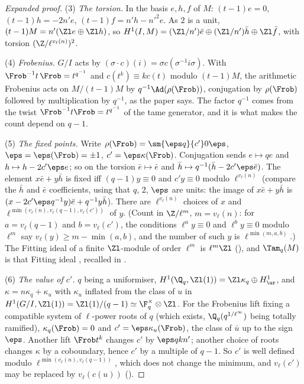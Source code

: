 \begin{sloppypar}
\begin{proof}[Expanded proof]
(3) \emph{The torsion.} In the basis $e,h,f$ of $M$: $(t-1)e=0$, $(t-1)h=-2n'e$, $(t-1)f=n'h-n'^2e$. As $2$ is a unit, $(t-1)M=n'(\Zl e\oplus\Zl h)$, so
$H^1(I,M)=(\Zl/n')\bar e\oplus(\Zl/n')\bar h\oplus\Zl\bar f$, with torsion $(\Z/\ell^{v_\ell(n)})^2$.

(4) \emph{Frobenius.} $G/I$ acts by $(\sigma\cdot c)(i)=\sigma c(\sigma^{-1}i\sigma)$. With $\Frob^{-1}t\,\Frob=t^{q^{-1}}$ and $c(t^k)\equiv kc(t)$ modulo $(t-1)M$, the arithmetic Frobenius acts on
$M/(t-1)M$ by $q^{-1}\Ad(\rho(\Frob))$, conjugation by $\rho(\Frob)$ followed by multiplication by $q^{-1}$, as the paper says. The factor $q^{-1}$ comes from the twist
$\Frob^{-1}t\Frob=t^{q^{-1}}$ of the tame generator, and it is what makes the count depend on $q-1$.

(5) \emph{The fixed points.} Write $\rho(\Frob)=\sm{\eps q}{c'}0{\eps}$, $\eps=\eps(\Frob)=\pm1$, $c'=\eps\kappa(\Frob)$. Conjugation sends $e\mapsto qe$ and $h\mapsto h-2c'\eps e$; so on the torsion
$\bar e\mapsto\bar e$ and $\bar h\mapsto q^{-1}(\bar h-2c'\eps\bar e)$. The element $x\bar e+y\bar h$ is fixed iff $(q-1)y\equiv0$ and $c'y\equiv0$ modulo $\ell^{v_\ell(n)}$ (compare the $\bar h$ and $\bar e$
coefficients, using that $q$, $2$, $\eps$ are units: the image of $x\bar e+y\bar h$ is $(x-2c'\eps q^{-1}y)\bar e+q^{-1}y\bar h$). There are $\ell^{v_\ell(n)}$ choices of $x$ and $\ell^{\min(v_\ell(n),v_\ell(q-1),v_\ell(c'))}$ of $y$.
(Count in $\Z/\ell^m$, $m=v_\ell(n)$: for $a=v_\ell(q-1)$ and $b=v_\ell(c')$, the conditions $\ell^ay\equiv0$ and $\ell^by\equiv0$ modulo $\ell^m$ say $v_\ell(y)\ge m-\min(a,b)$, and the number of such $y$ is
$\ell^{\min(m,a,b)}$.) The Fitting ideal of a finite $\Zl$-module of order
$\ell^m$ is $\ell^m\Zl$ (), and $\Tam_q(M)$ is that Fitting ideal \cite[I.4.2.2]{FPR94}, recalled in \cite[p.~708]{DFG04}.

(6) \emph{The value of $c'$.} $q$ being a uniformiser, $H^1(\Q_q,\Zl(1))=\Zl\kappa_q\oplus H^1_{\ur}$, and $\kappa=n\kappa_q+\kappa_u$ with $\kappa_u$ inflated from the class of $u$ in
$H^1(G/I,\Zl(1))=\Zl(1)/(q-1)\simeq\F_q^\times\otimes\Zl$. For the Frobenius lift fixing a compatible system of $\ell$-power roots of $q$ (which exists, $\Q_q(q^{1/\ell^\infty})$ being totally
ramified), $\kappa_q(\Frob)=0$ and $c'=\eps\kappa_u(\Frob)$, the class of $\bar u$ up to the sign $\eps$. Another lift $\Frob t^k$ changes $c'$ by $\eps qkn'$; another choice of roots changes $\kappa$ by
a coboundary, hence $c'$ by a multiple of $q-1$. So $c'$ is well defined modulo $\ell^{\min(v_\ell(n),v_\ell(q-1))}$, which does not change the minimum, and $v_\ell(c')$ may be replaced by
$v_\ell(c(u))$ ().


\end{proof}
\end{sloppypar}

